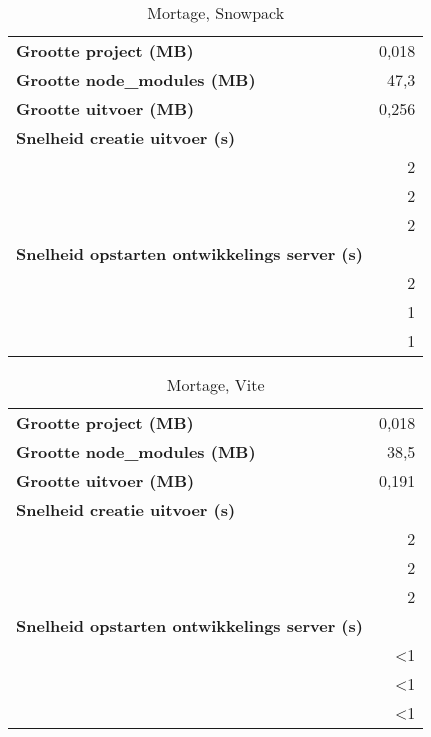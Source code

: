         \begin{table}[h]
            \centering
            \begin{tabular}{lr}
            \textbf{Grootte project (MB)} & 0,018 \\
            \textbf{Grootte node\_modules (MB)} & 47,3 \\
            \textbf{Grootte uitvoer (MB)} & 0,256 \\
            \textbf{Snelheid creatie uitvoer (s)} & \\
            \textbf{} & 2 \\
            \textbf{} & 2 \\
            \textbf{} & 2 \\
            \textbf{Snelheid opstarten ontwikkelings server (s)} & \\
            \textbf{} & 2 \\
            \textbf{} & 1 \\
            \textbf{} & 1
            \end{tabular}
            \caption{Mortage, Snowpack}
            \end{table}
 
            \begin{table}[h]
                \centering
                \begin{tabular}{lr}
                \textbf{Grootte project (MB)} & 0,018 \\
                \textbf{Grootte node\_modules (MB)} & 38,5 \\
                \textbf{Grootte uitvoer (MB)} & 0,191 \\
                \textbf{Snelheid creatie uitvoer (s)} & \\
                \textbf{} & 2 \\
                \textbf{} & 2 \\
                \textbf{} & 2 \\
                \textbf{Snelheid opstarten ontwikkelings server (s)} & \\
                \textbf{} & <1 \\
                \textbf{} & <1 \\
                \textbf{} & <1
                \end{tabular}
                \caption{Mortage, Vite}
                \end{table}

